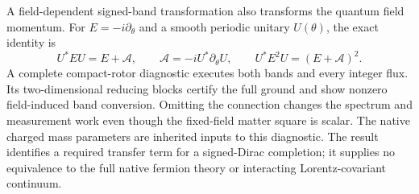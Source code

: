 A field-dependent signed-band transformation also transforms the quantum
field momentum. For $E=-i\partial_\theta$ and a smooth periodic unitary
$U(\theta)$, the exact identity is
\[
 U^* E U=E+\mathcal A,\qquad
 \mathcal A=-iU^*\partial_\theta U,\qquad
 U^* E^2U=(E+\mathcal A)^2.
\]
A complete compact-rotor diagnostic executes both bands and every integer
flux. Its two-dimensional reducing blocks certify the full ground and show
nonzero field-induced band conversion. Omitting the connection changes the
spectrum and measurement work even though the fixed-field matter square is
scalar. The native charged mass parameters are inherited inputs to this
diagnostic. The result identifies a required transfer term for a signed-Dirac
completion; it supplies no equivalence to the full native fermion theory or
interacting Lorentz-covariant continuum.
